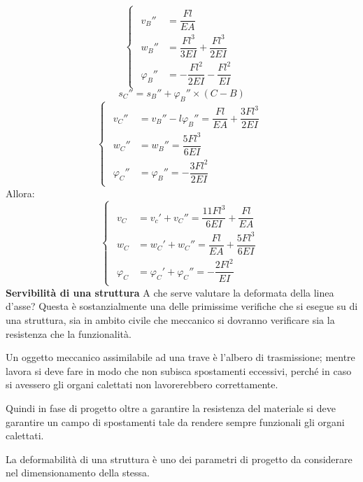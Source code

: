 \documentclass{article}
\begin{document}
\begin{adjustwidth}{2in}{}
		\[
		\begin{cases}
			\begin{aligned}
				v_B''& = \dfrac{Fl}{EA} \\
				w_B''& = \dfrac{Fl^3}{3EI} + \dfrac{Fl^3}{2EI}  \\
				\varphi_B''& = -\dfrac{Fl^2}{2EI} -\dfrac{Fl^2}{EI}
			\end{aligned}
		\end{cases}
		\]
		\[ s_C'' = s_B'' +\varphi_B'' \times (C-B) \]
		\[
		\begin{cases}
			\begin{aligned}
				v_C''& = v_B'' - l\varphi_B'' =  \dfrac{Fl}{EA} + \dfrac{3Fl^3}{2EI}\\
				w_C''& = w_B'' =  \dfrac{5Fl^3}{6EI}   \\
				\varphi_C''& = \varphi_B'' =  -\dfrac{3Fl^2}{2EI}  
			\end{aligned}
		\end{cases}
		\]
		Allora:
		\[
		\begin{cases}
			\begin{aligned}
				v_C& = v_c' +v_C'' =  \dfrac{11Fl^3}{6EI} + \dfrac{Fl}{EA}\\
				w_C& = w_C' + w_C'' = \dfrac{Fl}{EA} + \dfrac{5Fl^3}{6EI}   \\
				\varphi_C& = \varphi_C' + \varphi_C'' =  -\dfrac{2Fl^2}{EI}  
			\end{aligned}
		\end{cases}
		\]
\newpage		
{\Large \textbf{Servibilità di una struttura}} \mbox{} \newline
		A che serve valutare la deformata della linea d'asse? Questa è sostanzialmente una delle primissime verifiche che si esegue su di una struttura, sia in ambito civile che meccanico si dovranno verificare sia la resistenza che la funzionalità. \newline 
		
		Un oggetto meccanico assimilabile ad una trave è l'albero di trasmissione; mentre lavora si deve fare in modo che non subisca spostamenti eccessivi, perché in caso si avessero gli organi calettati non lavorerebbero correttamente.\newline 
		
		Quindi in fase di progetto oltre a garantire la resistenza del materiale si deve garantire un campo di spostamenti tale da rendere sempre funzionali gli organi calettati. \newline
		
		La deformabilità di una struttura è uno dei parametri di progetto da considerare nel dimensionamento
		della stessa. \newline
		

\end{adjustwidth}
\end{document}
